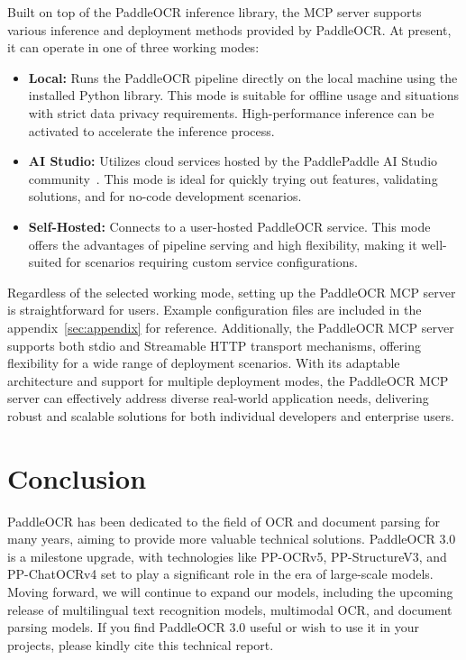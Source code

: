 \documentclass[11pt, a4paper, logo, copyright, nonumbering]{paddleocr}
\begin{document}
Built on top of the PaddleOCR inference library, the MCP server supports various inference and deployment methods provided by PaddleOCR. At present, it can operate in one of three working modes:

\begin{itemize}
    \item \textbf{Local:} Runs the PaddleOCR pipeline directly on the local machine using the installed Python library. This mode is suitable for offline usage and situations with strict data privacy requirements. High-performance inference can be activated to accelerate the inference process.
    \item \textbf{AI Studio:} Utilizes cloud services hosted by the PaddlePaddle AI Studio community~\citep{aistudio}. This mode is ideal for quickly trying out features, validating solutions, and for no-code development scenarios. 
    \item \textbf{Self-Hosted:} Connects to a user-hosted PaddleOCR service. This mode offers the advantages of pipeline serving and high flexibility, making it well-suited for scenarios requiring custom service configurations.
\end{itemize}

Regardless of the selected working mode, setting up the PaddleOCR MCP server is straightforward for users. Example configuration files are included in the appendix~\ref{sec:appendix} for reference. Additionally, the PaddleOCR MCP server supports both stdio and Streamable HTTP transport mechanisms, offering flexibility for a wide range of deployment scenarios. With its adaptable architecture and support for multiple deployment modes, the PaddleOCR MCP server can effectively address diverse real-world application needs, delivering robust and scalable solutions for both individual developers and enterprise users.

\section{Conclusion}

PaddleOCR has been dedicated to the field of OCR and document parsing for many years, aiming to provide more valuable technical solutions. PaddleOCR 3.0 is a milestone upgrade, with technologies like PP-OCRv5, PP-StructureV3, and PP-ChatOCRv4 set to play a significant role in the era of large-scale models. Moving forward, we will continue to expand our models, including the upcoming release of multilingual text recognition models, multimodal OCR, and document parsing models. If you find PaddleOCR 3.0 useful or wish to use it in your projects, please kindly cite this technical report.
\end{document}
